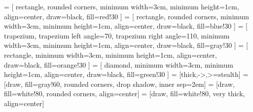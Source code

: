 \usetikzlibrary{shapes,arrows,shadows,positioning,fit,backgrounds,automata}
\usetikzlibrary{calc}

\tikzset{
    ->,  %
    >=stealth', %
    node distance=3cm %
    }
 = [
    rectangle, rounded corners, minimum width=3cm, minimum height=1cm,
    align=center, draw=black, fill=red!30
    ]
 = [
    rectangle, rounded corners, minimum width=3cm, minimum height=1cm,
    align=center, draw=black, fill=blue!30
    ]
 = [
    trapezium, trapezium left angle=70, trapezium right angle=110, 
    minimum width=3cm, minimum height=1cm, align=center, draw=black,
    fill=gray!30
    ]
 = [
    rectangle, minimum width=3cm, minimum height=1cm, align=center, 
    draw=black, fill=orange!30
    ]
 = [
    diamond, minimum width=3cm, minimum height=1cm, align=center, draw=black,
    fill=green!30
    ]
 = [thick,->,>=stealth]
 = [draw, fill=gray!60, rounded corners, drop shadow,
    inner sep=2em]
 = [draw, fill=white!80, rounded corners, align=center]
 = [draw, fill=white!80, very thick, align=center]